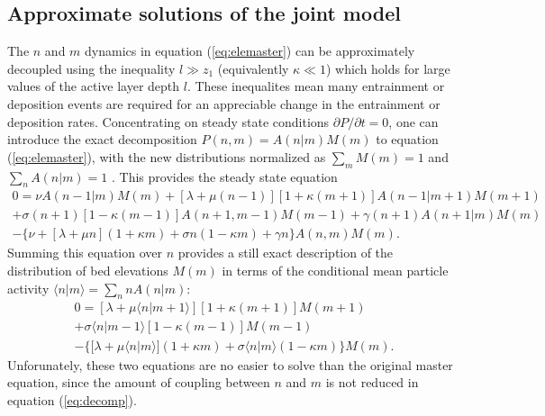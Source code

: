 \subsection{Approximate solutions of the joint model}
\label{sec:analytical}

The $n$ and $m$ dynamics in equation (\ref{eq:elemaster}) can be approximately decoupled using the inequality $l \gg z_1$ (equivalently $\kappa \ll 1$) which holds for large values of the active layer depth $l$.
These inequalites mean many entrainment or deposition events are required for an appreciable change in the entrainment or deposition rates.
Concentrating on steady state conditions $\partial P/\partial t = 0$, one can introduce the exact decomposition $P(n,m) = A(n|m)M(m)$ to equation (\ref{eq:elemaster}), with the new distributions normalized as $\sum_m M(m)=1$ and $\sum_n A(n|m)=1$ \citep[e.g.][]{Haken1978}.
This provides the steady state equation
\begin{multline}
	0 =  
	\nu A(n-1|m)M(m) + [\lambda + \mu(n-1)][1+\kappa(m+1)]A(n-1|m+1)M(m+1)\\  
	+ \sigma(n+1)[1-\kappa(m-1)]A(n+1,m-1)M(m-1) + \gamma(n+1)A(n+1|m)M(m) \\
	- 
	\{ \nu + [\lambda+ \mu n ](1+\kappa m) +  \sigma n ( 1- \kappa m) + \gamma n \}A(n,m)M(m).
	\label{eq:decomp}
\end{multline}
Summing this equation over $n$ provides a still exact description of the distribution of bed elevations $M(m)$ in terms of the conditional mean particle activity $\langle n | m \rangle = \sum_{n}nA(n|m)$:
\begin{multline}
	0 =  [\lambda + \mu\langle n | m+1\rangle][1+\kappa(m+1)]M(m+1)
	\\+ \sigma\langle n | m-1\rangle[1-\kappa(m-1)]M(m-1) \\
	- 
	\{  [\lambda+ \mu \langle n | m\rangle ](1+\kappa m) +  \sigma  \langle n | m\rangle( 1- \kappa m) \}M(m).
	\label{eq:approxele}
\end{multline}
Unforunately, these two equations are no easier to solve than the original master equation, since the amount of coupling between $n$ and $m$ is not reduced in equation (\ref{eq:decomp}).

